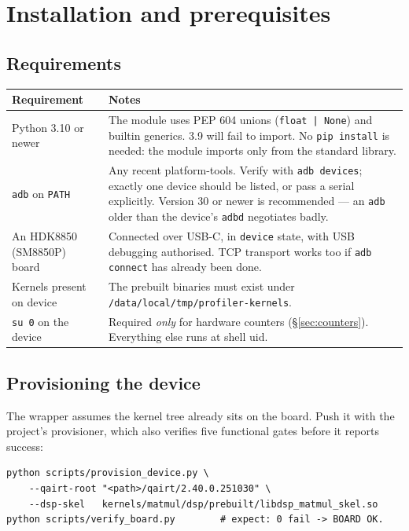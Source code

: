 \documentclass[11pt,a4paper]{article}
\newcommand{\code}[1]{\texttt{\let\_\breakableunderscore #1}}
\newcommand{\breakableunderscore}{\textunderscore\allowbreak}
\begin{document}
\section{Installation and prerequisites}
\label{sec:install}

\subsection{Requirements}

\begin{longtable}{@{}p{4.2cm}p{10.5cm}@{}}
\toprule
\textbf{Requirement} & \textbf{Notes} \\
\midrule
\endhead
Python 3.10 or newer & The module uses PEP 604 unions (\code{float | None})
  and builtin generics. 3.9 will fail to import. No \code{pip install} is
  needed: the module imports only from the standard library. \\
\code{adb} on \code{PATH} & Any recent platform-tools. Verify with
  \code{adb devices}; exactly one device should be listed, or pass a serial
  explicitly. Version 30 or newer is recommended --- an \code{adb} older than
  the device's \code{adbd} negotiates badly. \\
An HDK8850 (SM8850P) board & Connected over USB-C, in \code{device} state, with
  USB debugging authorised. TCP transport works too if \code{adb connect} has
  already been done. \\
Kernels present on device & The prebuilt binaries must exist under
  \code{/data/local/tmp/profiler-kernels}. \\
\code{su 0} on the device & Required \emph{only} for hardware counters
  (\S\ref{sec:counters}). Everything else runs at shell uid. \\
\bottomrule
\end{longtable}

\subsection{Provisioning the device}

The wrapper assumes the kernel tree already sits on the board. Push it with the
project's provisioner, which also verifies five functional gates before it
reports success:

\begin{lstlisting}[style=sh]
python scripts/provision_device.py \
    --qairt-root "<path>/qairt/2.40.0.251030" \
    --dsp-skel   kernels/matmul/dsp/prebuilt/libdsp_matmul_skel.so
python scripts/verify_board.py        # expect: 0 fail -> BOARD OK.
\end{lstlisting}
\end{document}
